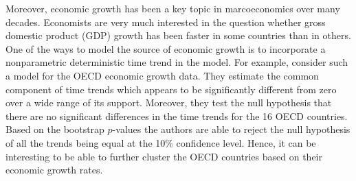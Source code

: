 \documentclass[a4paper,12pt]{article}
\begin{document}
\begin{example}
Moreover, economic growth has been a key topic in marcoeconomics over many decades. Economists are very much interested in the question whether gross domestic product (GDP) growth  has been faster in some countries than in others. One of the ways to model the source of economic growth is to incorporate a nonparametric deterministic time trend in the model. For example, \cite{Zhang2012} consider such a model for the OECD economic growth data.
They estimate the common component of time trends which appears to be significantly different from zero over a wide range of its support. Moreover, they test the null hypothesis that there are no significant differences in the time trends for the 16 OECD countries. Based on the bootstrap $p$-values the authors are able to reject the null hypothesis of all the trends being equal at the 10\% confidence level. Hence, it can be interesting to be able to further cluster the OECD countries based on their economic growth rates.
\end{example}
\end{document}
